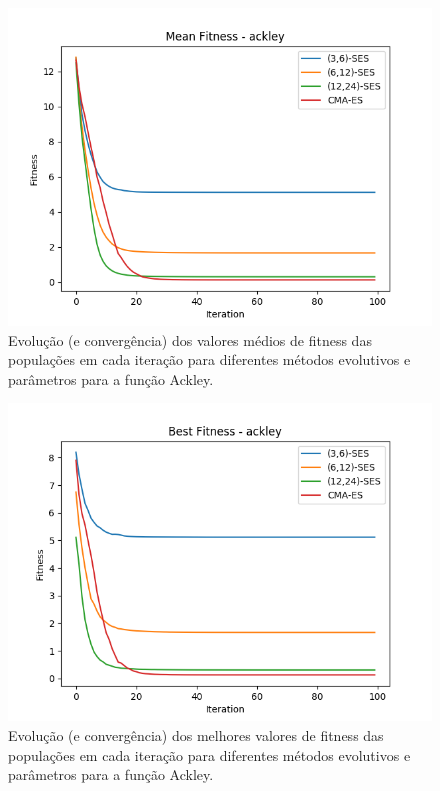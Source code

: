 \documentclass[conference]{IEEEtran}
\begin{document}
\begin{figure}[htbp]
\centering
\centerline{\includegraphics[scale=0.5]{imagens/ackley/mean_fitness.png}}
\caption{Evolução (e convergência) dos valores médios de fitness das populações em cada iteração para diferentes métodos evolutivos e parâmetros para a função Ackley.}
\label{ackley/mean_fitness}
\end{figure}

\begin{figure}[htbp]
\centering
\centerline{\includegraphics[scale=0.5]{imagens/ackley/best_fitness.png}}
\caption{Evolução (e convergência) dos melhores valores de fitness das populações em cada iteração para diferentes métodos evolutivos e parâmetros para a função Ackley.}
\label{ackley/best_fitness}
\end{figure}
\end{document}
